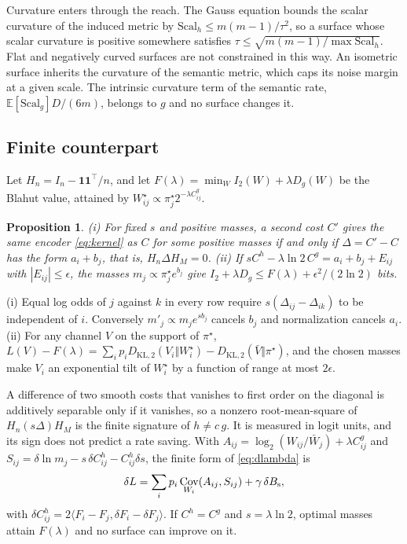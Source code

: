 \documentclass[journal]{IEEEtran}
\newtheorem{proposition}{Proposition}
\newcommand{\E}{\mathbb E}
\newcommand{\KLb}{D_{\mathrm{KL},2}}
\DeclareMathOperator{\Cov}{Cov}
\begin{document}
Curvature enters through the reach. The Gauss equation bounds the scalar curvature of the induced metric by $\mathrm{Scal}_h\le m(m-1)/\tau^2$, so a surface whose scalar curvature is positive somewhere satisfies $\tau\le\sqrt{m(m-1)/\max\mathrm{Scal}_h}$. Flat and negatively curved surfaces are not constrained in this way. An isometric surface inherits the curvature of the semantic metric, which caps its noise margin at a given scale. The intrinsic curvature term of the semantic rate, $\E[\mathrm{Scal}_g]D/(6m)$, belongs to $g$ and no surface changes it.

\subsection{Finite counterpart}
Let $H_n=I_n-\mathbf 1\mathbf 1^\top/n$, and let $F(\lambda)=\min_WI_2(W)+\lambda D_g(W)$ be the Blahut value, attained by $W^\star_{ij}\propto\pi^\star_j2^{-\lambda C^g_{ij}}$.
\begin{proposition}\label{prop:contrast}
(i) For fixed $s$ and positive masses, a second cost $C'$ gives the same encoder \eqref{eq:kernel} as $C$ for some positive masses if and only if $\Delta=C'-C$ has the form $a_i+b_j$, that is, $H_n\Delta H_M=0$. (ii) If $sC^h-\lambda\ln2\,C^g=a_i+b_j+E_{ij}$ with $|E_{ij}|\le\epsilon$, the masses $m_j\propto\pi^\star_je^{b_j}$ give $I_2+\lambda D_g\le F(\lambda)+\epsilon^2/(2\ln2)$ bits.
\end{proposition}
\begin{IEEEproof}
(i) Equal log odds of $j$ against $k$ in every row require $s(\Delta_{ij}-\Delta_{ik})$ to be independent of $i$. Conversely $m'_j\propto m_je^{sb_j}$ cancels $b_j$ and normalization cancels $a_i$. (ii) For any channel $V$ on the support of $\pi^\star$, $L(V)-F(\lambda)=\sum_ip_i\KLb(V_i\Vert W^\star_i)-\KLb(\bar V\Vert\pi^\star)$, and the chosen masses make $V_i$ an exponential tilt of $W^\star_i$ by a function of range at most $2\epsilon$.
\end{IEEEproof}
A difference of two smooth costs that vanishes to first order on the diagonal is additively separable only if it vanishes, so a nonzero root-mean-square of $H_n(s\Delta)H_M$ is the finite signature of $h\ne c\,g$. It is measured in logit units, and its sign does not predict a rate saving. With $A_{ij}=\log_2(W_{ij}/\bar W_j)+\lambda C^g_{ij}$ and $S_{ij}=\delta\ln m_j-s\,\delta C^h_{ij}-C^h_{ij}\delta s$, the finite form of \eqref{eq:dlambda} is
\begin{equation}
 \delta L=\sum_i p_i\Cov_{W_i}(A_{ij},S_{ij})+\gamma\,\delta B_{\rm s}, \label{eq:variation}
\end{equation}
with $\delta C^h_{ij}=2\langle F_i-F_j,\delta F_i-\delta F_j\rangle$. If $C^h=C^g$ and $s=\lambda\ln2$, optimal masses attain $F(\lambda)$ and no surface can improve on it.
\end{document}
